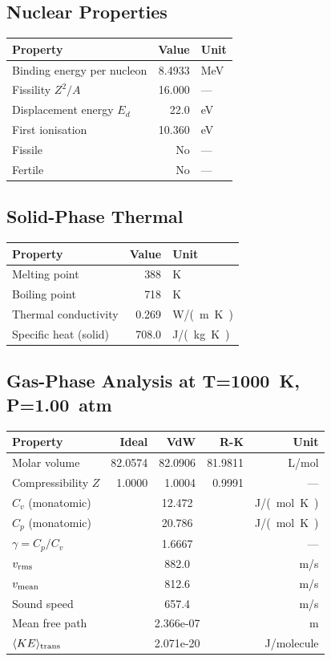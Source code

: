 \documentclass[11pt,a4paper]{article}
\begin{document}
\subsection{Nuclear Properties}
\begin{tabular}{lrl}
  \toprule
  Property & Value & Unit \\
  \midrule
  Binding energy per nucleon & 8.4933 & \si{MeV} \\
  Fissility $Z^2/A$ & 16.000 & --- \\
  Displacement energy $E_d$ & 22.0 & \si{eV} \\
  First ionisation & 10.360 & \si{eV} \\
  Fissile & No & --- \\
  Fertile & No & --- \\
  \bottomrule
\end{tabular}

\subsection{Solid-Phase Thermal}
\begin{tabular}{lrl}
  \toprule
  Property & Value & Unit \\
  \midrule
  Melting point & 388 & \si{K} \\
  Boiling point & 718 & \si{K} \\
  Thermal conductivity & 0.269 & \si{W/(m.K)} \\
  Specific heat (solid) & 708.0 & \si{J/(kg.K)} \\
  \bottomrule
\end{tabular}

\subsection{Gas-Phase Analysis at T=\SI{1000}{K}, P=\SI{1.00}{atm}}
\begin{tabular}{lrrrr}
  \toprule
  Property & Ideal & VdW & R-K & Unit \\
  \midrule
  Molar volume & 82.0574 & 82.0906 & 81.9811 & \si{L/mol} \\
  Compressibility $Z$ & 1.0000 & 1.0004 & 0.9991 & --- \\
  \midrule
  $C_v$ (monatomic) & \multicolumn{3}{c}{12.472} & \si{J/(mol.K)} \\
  $C_p$ (monatomic) & \multicolumn{3}{c}{20.786} & \si{J/(mol.K)} \\
  $\gamma = C_p/C_v$ & \multicolumn{3}{c}{1.6667} & --- \\
  $v_{\rm rms}$ & \multicolumn{3}{c}{882.0} & \si{m/s} \\
  $v_{\rm mean}$ & \multicolumn{3}{c}{812.6} & \si{m/s} \\
  Sound speed & \multicolumn{3}{c}{657.4} & \si{m/s} \\
  Mean free path & \multicolumn{3}{c}{2.366e-07} & \si{m} \\
  $\langle KE \rangle_{\rm trans}$ & \multicolumn{3}{c}{2.071e-20} & \si{J/molecule} \\
  \bottomrule
\end{tabular}
\end{document}
